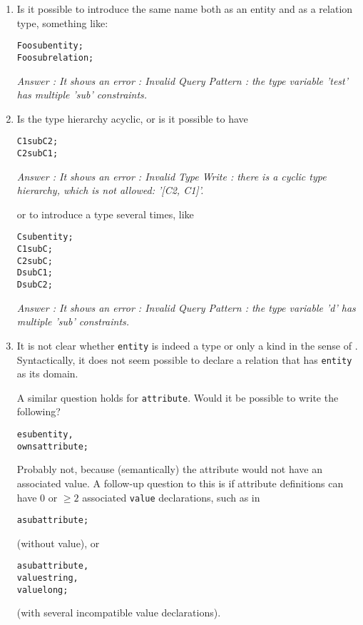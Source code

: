\documentclass[runningheads]{llncs}
\begin{document}
\begin{enumerate}
\item Is it possible to introduce the same name both as an entity and as a
  relation type, something like:

  \begin{alltt}
    Foo sub entity;
    Foo sub relation;
  \end{alltt}
  
\emph{Answer : It shows an error : Invalid Query Pattern : the type variable 'test' has multiple 'sub' constraints.	 }
	
	

	
\item Is the type hierarchy acyclic, or is it possible to have
  \begin{alltt}
    C1 sub C2;
    C2 sub C1;
  \end{alltt}

\emph{Answer : It shows an error : Invalid Type Write : there is a cyclic type hierarchy, which is not allowed: '[C2, C1]'. }  
  
  
  or to introduce a type several times, like
  \begin{alltt}
    C sub entity;
    C1 sub C;
    C2 sub C;
    D sub C1;
    D sub C2;
  \end{alltt}
  
\emph{Answer : It shows an error : Invalid Query Pattern : the type variable 'd' has multiple 'sub' constraints. }  

\item It is not clear whether \texttt{entity} is indeed a type or only a kind
  in the sense of . Syntactically, it does not
  seem possible to declare a relation that has \texttt{entity} as its domain.

  A similar question holds for \texttt{attribute}. Would it be possible to
  write the following?

  \begin{alltt}
  e sub entity,
    owns attribute;
  \end{alltt}

  Probably not, because (semantically) the attribute would not have an
  associated value. A follow-up question to this is if attribute definitions
  can have 0 or $\geq 2$ associated \texttt{value} declarations, such as in
  \begin{alltt}
    a sub attribute;
  \end{alltt}
  (without value),  or
  \begin{alltt}
    a sub attribute,
    value string,
    value long;
  \end{alltt}
  (with several incompatible value declarations).
  

\end{enumerate}
\end{document}
